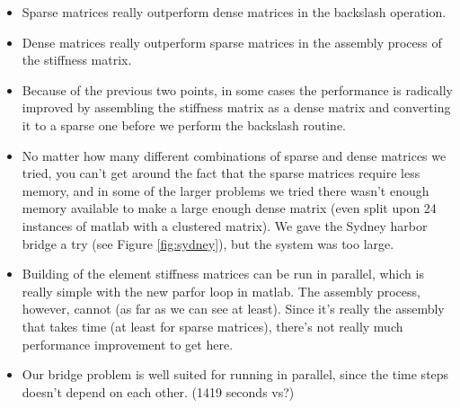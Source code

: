 \begin{itemize}
\item Sparse matrices really outperform dense matrices in the backslash operation.
\item Dense matrices really outperform sparse matrices in the assembly process of the stiffness matrix.
\item Because of the previous two points, in some cases the performance is radically improved by assembling the stiffness matrix as a dense matrix and converting it to a sparse one before we perform the backslash routine.
\item No matter how many different combinations of sparse and dense matrices we tried, you can't get around the fact that the sparse matrices require less memory, and in some of the larger problems we tried there wasn't enough memory available to make a large enough dense matrix (even split upon 24 instances of matlab with a clustered matrix). We gave the Sydney harbor bridge a try (see Figure \ref{fig:sydney}), but the system was too large.
\item Building of the element stiffness matrices can be run in parallel, which is really simple with the new parfor loop in matlab. The assembly process, however, cannot (as far as we can see at least). Since it's really the assembly that takes time (at least for sparse matrices), there's not really much performance improvement to get here.
\item Our bridge problem is well suited for running in parallel, since the time steps doesn’t depend on each other. (1419 seconds vs?)
\end{itemize}
